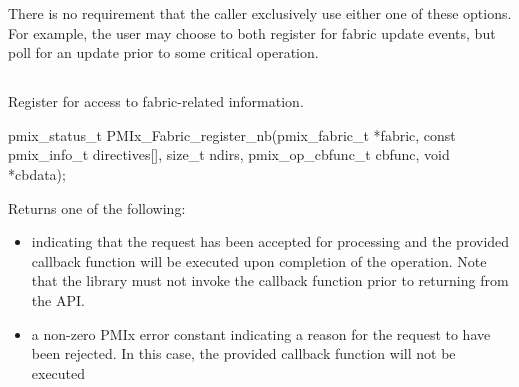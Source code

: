 There is no requirement that the caller exclusively use either one of these options. For example, the user may choose to both register for fabric update events, but poll for an update prior to some critical operation.

\subsection{}

\summary

Register for access to fabric-related information.

\format

\cspecificstart
\begin{codepar}
pmix_status_t
PMIx_Fabric_register_nb(pmix_fabric_t *fabric,
                        const pmix_info_t directives[],
                        size_t ndirs,
                        pmix_op_cbfunc_t cbfunc, void *cbdata);
\end{codepar}
\cspecificend

\begin{arglist}
\end{arglist}

Returns one of the following:

\begin{itemize}
\item {} indicating that the request has been accepted for processing and the provided callback function will be executed upon completion of the operation. Note that the library must not invoke the callback function prior to returning from the \ac{API}.
\item a non-zero \ac{PMIx} error constant indicating a reason for the request to have been rejected. In this case, the provided callback function will not be executed
\end{itemize}


